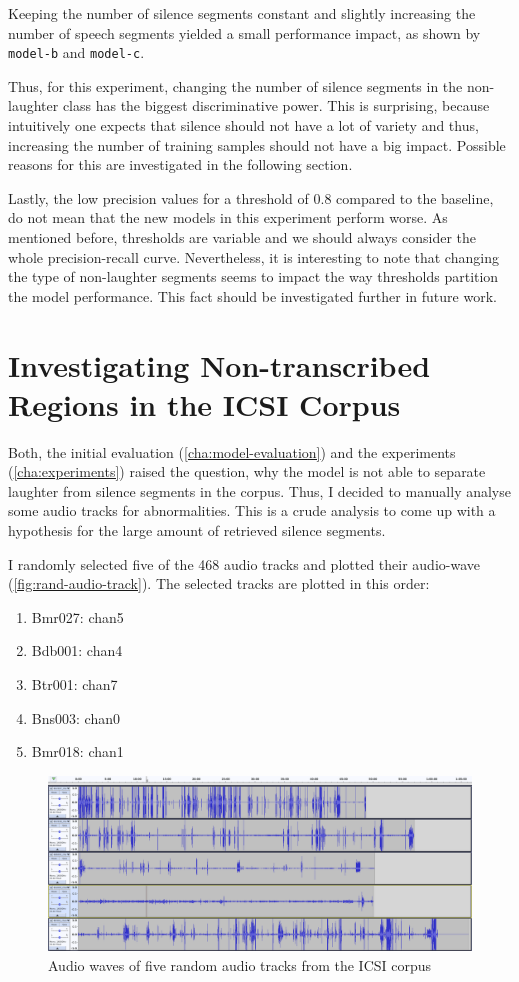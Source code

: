 \documentclass[bsc,frontabs,parskip,deptreport]{infthesis}
\begin{document}
Keeping the number of silence segments constant and slightly increasing the number of speech segments yielded a small performance impact, as shown by \texttt{model-b} and \texttt{model-c}.

Thus, for this experiment, changing the number of silence segments in the non-laughter class has the biggest discriminative power. This is surprising, because intuitively one expects that silence should not have a lot of variety and thus, increasing the number of training samples should not have a big impact. Possible reasons for this are investigated in the following section.

Lastly, the low precision values for a threshold of 0.8 compared to the baseline, do not mean that the new models in this experiment perform worse. As mentioned before, thresholds are variable and we should always consider the whole precision-recall curve. Nevertheless, it is interesting to note that changing the type of non-laughter segments seems to impact the way thresholds partition the model performance. This fact should be investigated further in future work.

\section{Investigating Non-transcribed Regions in the ICSI Corpus} \label{sec:silence-regions}
Both, the initial evaluation (\autoref{cha:model-evaluation}) and the experiments (\autoref{cha:experiments}) raised the question, why the model is not able to separate laughter from silence segments in the corpus. Thus, I decided to manually analyse some audio tracks for abnormalities. This is a crude analysis to come up with a hypothesis for the large amount of retrieved silence segments.

I randomly selected five of the 468 audio tracks and plotted their audio-wave (\autoref{fig:rand-audio-track}). The selected tracks are plotted in this order:
\begin{enumerate}
    \item Bmr027: chan5
    \item Bdb001: chan4
    \item Btr001: chan7
    \item Bns003: chan0
    \item Bmr018: chan1
\end{enumerate}

\begin{figure}[h!]
    \centering
    \includegraphics[width=14cm]{imgs/audio_waves/plotted_audio_waves.png}
    \caption{Audio waves of five random audio tracks from the ICSI corpus}
    \label{fig:rand-audio-track}
\end{figure}
\end{document}
